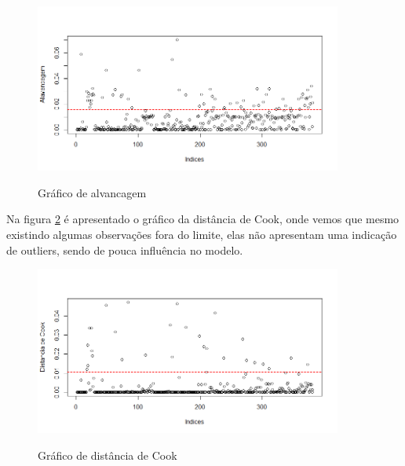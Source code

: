 \documentclass[a4paper]{article}
\begin{document}
\begin{figure}[H] 
    \centering %
    \caption{Gráfico de alvancagem}
    \includegraphics[width=0.9\textwidth]{imagens/Alav2.png}
    \label{fig:alav2}
\end{figure}


Na figura \ref{fig:cook2} é apresentado o gráfico da distância de Cook, onde vemos que mesmo existindo algumas observações fora do limite, elas não apresentam uma indicação de outliers, sendo de pouca influência no modelo.
\begin{figure}[H] 
    \centering %
    \caption{Gráfico de distância de Cook}
    \includegraphics[width=0.9\textwidth]{imagens/Cook2.png}
    \label{fig:cook2}
\end{figure}
\end{document}
